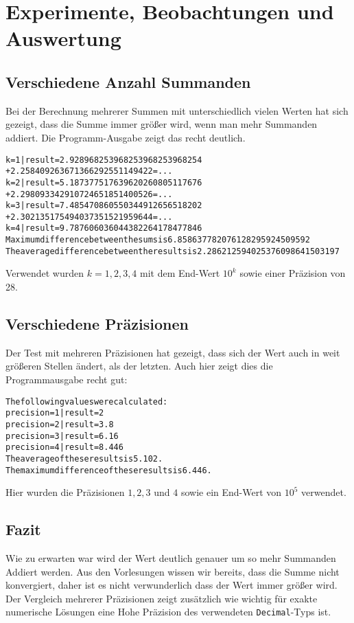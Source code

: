 \documentclass{article}
\begin{document}
	\section{Experimente, Beobachtungen und Auswertung}
	 
	\subsection{Verschiedene Anzahl Summanden}
	 
		Bei der Berechnung mehrerer Summen mit unterschiedlich vielen Werten hat sich gezeigt, dass die Summe immer größer wird, wenn man mehr Summanden addiert. Die Programm-Ausgabe zeigt das recht deutlich. 
		
		\begin{alltt}
			 k = 1  | result = 2.928968253968253968253968254
			                 + 2.258409263671366292551149422 = ...
			 k = 2  | result = 5.187377517639620260805117676
			                 + 2.298093342910724651851400526 = ...
			 k = 3  | result = 7.485470860550344912656518202
			                 + 2.302135175494037351521959644 = ...
			 k = 4  | result = 9.787606036044382264178477846
			 Maximum difference between the sums is 6.858637782076128295924509592
			 The average difference between the results is 2.286212594025376098641503197			
		\end{alltt}
		
		Verwendet wurden $k={1,2,3,4}$ mit dem End-Wert $10^k$ sowie einer Präzision von 28.
		
	\subsection{Verschiedene Präzisionen}
	
		Der Test mit mehreren Präzisionen hat gezeigt, dass sich der Wert auch in weit größeren Stellen ändert, als der letzten. Auch hier zeigt dies die Programmausgabe recht gut:
		
		\begin{alltt}
			The following values were calculated:
			 precision =   1 | result = 2
			 precision =   2 | result = 3.8
			 precision =   3 | result = 6.16
			 precision =   4 | result = 8.446
			The average of these results is 5.102.
			The maximum difference of these results is 6.446.
		\end{alltt}
		
		Hier wurden die Präzisionen $1, 2, 3$ und $4$ sowie ein End-Wert von $10^5$ verwendet.
		
	\subsection{Fazit}
	
		Wie zu erwarten war wird der Wert deutlich genauer um so mehr Summanden Addiert werden. Aus den Vorlesungen wissen wir bereits, dass die Summe nicht konvergiert, daher ist es nicht verwunderlich dass der Wert immer größer wird.\\
		Der Vergleich mehrerer Präzisionen zeigt zusätzlich wie wichtig für exakte numerische Lösungen eine Hohe Präzision des verwendeten \verb|Decimal|-Typs ist.
	
\end{document}
